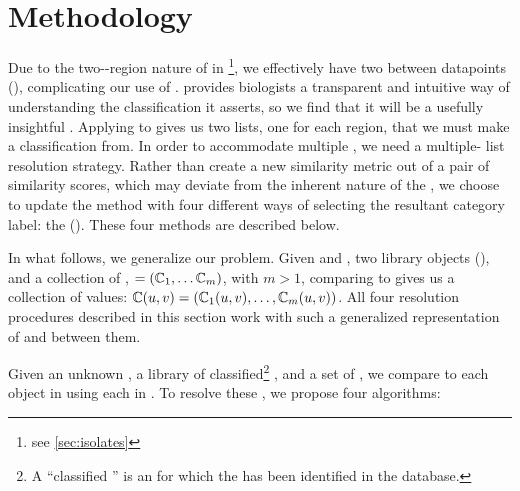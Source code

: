 \section{Methodology}\label{sec:methodology:krap}
Due to the two-\itsshort{}-region nature of \ecoli{} \isols{} in \cplop{}\footnote{see \autoref{sec:isolates}}, we effectively have two \compfuncs{} between datapoints (\isols{}), complicating our use of \kNN{}.
\kNN{} provides \cplop{} biologists a transparent and intuitive way of understanding the \spec{} classification it asserts, so we find that it will be a usefully insightful .
Applying \kNN{} to \cplop{} \isols{} gives us two lists, one for each \itsshort{} region, that we must make a classification from.
In order to accommodate multiple \compfuncs{}, we need a multiple-\knnlong{} list resolution strategy.
Rather than create a new similarity metric out of a pair of similarity scores, which may deviate from the inherent nature of the \compfunc{}, we choose to update the \kNN{} method with four different ways of selecting the resultant category label: the \kraplong{} (\krap{}).
These four methods are described below.

In what follows, we generalize our problem. Given \UNKNOWN{} and \KNOWN{}, two library objects (\isols{}), and a collection of \compfuncs{}, \COMP{}$=(\mathbb{C}{}_1,\ldots \mathbb{C}{}_m)$, with $m > 1$, comparing \UNKNOWN{} to \KNOWN{} gives us a collection of values:  
$\mathbb{C}{}(u{},v{}) = (\mathbb{C}{}_1(u{},v{}),\ldots,\mathbb{C}{}_m(u{},v{}))$.
All four resolution procedures described in this section work with such a generalized representation of \isols{} and \compfuncs{} between them.

Given an unknown \isol{} \UNKNOWN{}, a library of classified\footnote{A ``classified \isol{}'' is an \isol{} for which the \spec{} has been identified in the database.} \isols{} \LIB{}, and a set of \compfuncs{} \COMP{}, we compare \UNKNOWN{} to each object in \LIB{} using each \compfunc{} in \COMP{}. To resolve these \compfuncs{}, we propose four algorithms:


